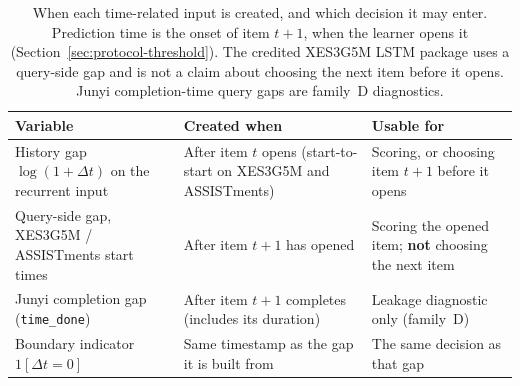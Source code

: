 \begin{table}[tbp]
\caption{When each time-related input is created, and which
decision it may enter. Prediction time is the onset of item
$t{+}1$, when the learner opens it
(Section~\ref{sec:protocol-threshold}). The credited XES3G5M
LSTM package uses a query-side gap and is not a claim about
choosing the next item before it opens. Junyi completion-time
query gaps are family~D diagnostics.}
\label{tab:availability}
\centering
\footnotesize
\begin{tabularx}{\textwidth}{@{}>{\raggedright\arraybackslash}p{3.4cm}>{\raggedright\arraybackslash}p{4.2cm}X@{}}
\toprule
Variable & Created when & Usable for \\
\midrule
History gap $\log(1{+}\Delta t)$ on the recurrent input & After item $t$ opens (start-to-start on XES3G5M and ASSISTments) & Scoring, or choosing item $t{+}1$ before it opens \\
Query-side gap, XES3G5M / ASSISTments start times & After item $t{+}1$ has opened & Scoring the opened item; \textbf{not} choosing the next item \\
Junyi completion gap (\texttt{time\_done}) & After item $t{+}1$ completes (includes its duration) & Leakage diagnostic only (family~D) \\
Boundary indicator $1[\Delta t{=}0]$ & Same timestamp as the gap it is built from & The same decision as that gap \\
\bottomrule
\end{tabularx}
\end{table}
